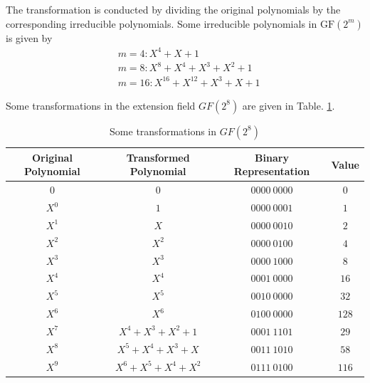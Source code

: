 \documentclass[journal]{IEEEtran}
\begin{document}
The transformation is conducted by dividing the original polynomials by the corresponding irreducible polynomials. Some irreducible polynomials in $\text{GF}({{2}^{m}})$ is given by
\begin{align}
  & m=4:{{X}^{4}}+X+1 \\ 
 & m=8:{{X}^{8}}+{{X}^{4}}+{{X}^{3}}+{{X}^{2}}+1 \\ 
 & m=16:{{X}^{16}}+{{X}^{12}}+{{X}^{3}}+X+1 
\end{align}

Some transformations in the extension field $GF(2^8)$ are given in Table. \ref{table:GF-2-8}. 

\begin{table}[htbp]
\caption{Some transformations in $GF(2^8)$} \label{table:GF-2-8}
\begin{center}
\begin{tabular}{c c c c}
\toprule[1pt]
 Original Polynomial            & Transformed Polynomial           & Binary Representation   & Value \\ \hline
  $0$                           & $0$                              & $0000\ 0000$             & $0$      \\
 $X^0$                          & $1$                              & $0000\ 0001$             & $1$      \\
 $X^1$                          & $X$                              & $0000\ 0010$             & $2$     \\
 $X^2$                          & $X^2$                            & $0000\ 0100$             & $4$     \\
 $X^3$                          & $X^3$                            & $0000\ 1000$             & $8$      \\
 $X^4$                          & $X^4$                            & $0001\ 0000$             & $16$      \\
 $X^5$                          & $X^5$                            & $0010\ 0000$             & $32$      \\
 $X^6$                          & $X^6$                            & $0100\ 0000$             & $128$     \\
 $X^7$                          & $X^4+X^3+X^2+1$                  & $0001\ 1101$             & $29$     \\
 $X^8$                          & $X^5+X^4+X^3+X$                  & $0011\ 1010$             & $58$     \\
 $X^9$                          & $X^6+X^5+X^4+X^2$                & $0111\ 0100$             & $116$     \\
\bottomrule[1pt]
\end{tabular}
\end{center}
\end{table}
\end{document}
